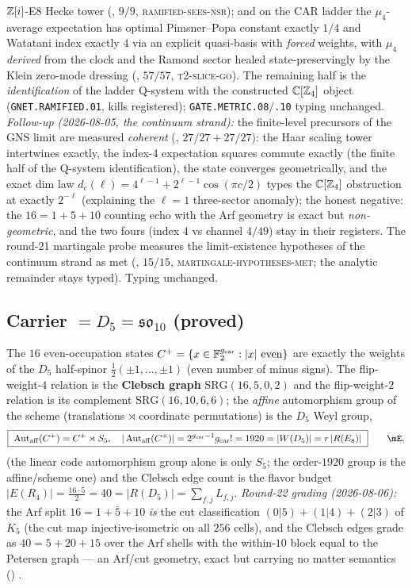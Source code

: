 $\mathbb{Z}[i]$-E8 Hecke tower (,
$9/9$, \textsc{ramified-sees-nsr}); and on the CAR ladder the
$\mu_4$-average expectation has optimal Pimsner--Popa constant
exactly $1/4$ and Watatani index exactly $4$ via an explicit
quasi-basis with \emph{forced} weights, with $\mu_4$ \emph{derived}
from the clock and the Ramond sector healed state-preservingly by
the Klein zero-mode dressing (,
$57/57$, \textsc{t2-slice-go}).  The remaining half is the
\emph{identification} of the ladder Q-system with the constructed
$\mathbb C[\mathbb{Z}_4]$ object (\texttt{GNET.RAMIFIED.01}, kills
registered); \texttt{GATE.METRIC.08}/\texttt{.10} typing unchanged.
\emph{Follow-up (2026-08-05, the continuum strand):} the
finite-level precursors of the GNS limit are measured
\emph{coherent} (, $27/27+27/27$):
the Haar scaling tower intertwines exactly, the index-4
expectation squares commute exactly (the finite half of the
Q-system identification), the state converges geometrically, and
the exact dim law $d_c(\ell)=4^{\ell-1}+2^{\ell-1}\cos(\pi c/2)$
types the $\mathbb C[\mathbb{Z}_4]$ obstruction at exactly $2^{-\ell}$
(explaining the $\ell=1$ three-sector anomaly); the honest
negative: the $16=1{+}5{+}10$ counting echo with the Arf geometry
is exact but \emph{non-geometric}, and the two fours (index $4$
vs channel $4/49$) stay in their registers.  The round-21
martingale probe measures the limit-existence hypotheses of the
continuum strand as met
(, $15/15$,
\textsc{martingale-hypotheses-met}; the analytic remainder stays
typed).  Typing unchanged.

\TFPTdoublepushout

\subsection{Carrier $=D_5=\mathfrak{so}_{10}$ (proved)}
The $16$ even-occupation states $C^+=\{x\in\mathbb F_2^{g_{\mathrm{car}}}:|x|\ \text{even}\}$ are exactly the
weights of the $D_5$ half-spinor $\tfrac12(\pm1,\dots,\pm1)$ (even number of minus signs). The
flip-weight-$4$ relation is the \textbf{Clebsch graph} $\mathrm{SRG}(16,5,0,2)$ and the flip-weight-$2$
relation is its complement $\mathrm{SRG}(16,10,6,6)$; the \emph{affine} automorphism group of the scheme
(translations $\rtimes$ coordinate permutations) is the $D_5$ Weyl group,
\begin{equation}
  \boxed{\ \operatorname{Aut}_{\mathrm{aff}}(C^+)=C^+\rtimes S_5,\quad |\operatorname{Aut}_{\mathrm{aff}}(C^+)|=2^{\gcar-1}\gcar!=1920=|W(D_5)|=r\,|R(E_8)|\ }\qquad\mE ,
\end{equation}
(the linear code automorphism group alone is only $S_5$; the order-$1920$ group is the affine/scheme one)
and the Clebsch edge count is the flavor budget $|E(R_4)|=\tfrac{16\cdot5}{2}=40=|R(D_5)|=\sum_{f,j}L_{f,j}$.
\emph{Round-22 grading (2026-08-06):} the Arf split $16=1+\bar5+10$ \emph{is} the cut
classification $(0|5)+(1|4)+(2|3)$ of $K_5$ (the cut map injective-isometric on all $256$ cells),
and the Clebsch edges grade as $40=5+20+15$ over the Arf shells with the within-$10$ block equal to
the Petersen graph --- an Arf/cut geometry, exact but carrying no matter semantics
() \mE.

